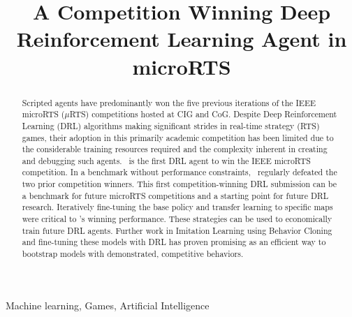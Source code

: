\documentclass[conference]{IEEEtran}
\begin{document}
\title{A Competition Winning Deep Reinforcement Learning Agent in microRTS}

\author{
    \IEEEauthorblockN{\authorName}
    \IEEEauthorblockA{\authorSecondary}
}

\maketitle
\IEEEoverridecommandlockouts
{}
\IEEEpubidadjcol

\begin{abstract}
Scripted agents have predominantly won the five
previous iterations of the IEEE microRTS ($\mu$RTS) competitions hosted at CIG and
CoG. Despite Deep Reinforcement Learning (DRL) algorithms making significant strides
in real-time strategy (RTS) games, their adoption in this primarily academic
competition has been limited  due to the considerable training resources required and the complexity
inherent in creating and debugging such agents. \agentName\ is the first DRL agent
to win the IEEE microRTS competition. In a benchmark without performance
constraints, \agentName\ regularly defeated the two
prior competition winners. This first competition-winning DRL submission can be
a benchmark for future microRTS competitions and a starting point for future DRL
research. Iteratively fine-tuning the base policy and transfer learning to specific maps were 
critical to \agentName's winning performance. These strategies can be used to
economically train future DRL agents. Further work in Imitation Learning using Behavior Cloning and
fine-tuning these models with DRL has proven promising as an efficient way
to bootstrap models with demonstrated, competitive behaviors.
\end{abstract}

\begin{IEEEkeywords}
    Machine learning, Games, Artificial Intelligence
\end{IEEEkeywords}
\end{document}
